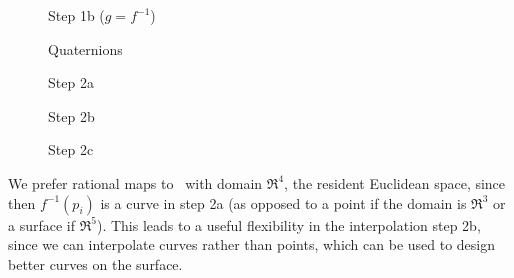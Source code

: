 \begin{figure}
\vspace{2in}
\caption{Step 1b ($g=f^{-1}$)}
\label{fig:alg1b}
\end{figure}

\begin{figure}
\vspace{2in}
\caption{Quaternions}
\label{fig:algdata}
\end{figure}

\begin{figure}
\vspace{2in}
\caption{Step 2a}
\label{fig:alg2a}
\end{figure}

\begin{figure}
\vspace{2in}
\caption{Step 2b}
\label{fig:alg2b}
\end{figure}

\begin{figure}
\vspace{2in}
\caption{Step 2c}
\label{fig:alg2c}
\end{figure}

\clearpage
\onecolumn

We prefer rational maps to \ with domain $\Re^4$, the resident
Euclidean space, since then $f^{-1}(p_i)$ is a curve in step 2a
(as opposed to a point if the domain is $\Re^3$ or a surface if $\Re^5$).
This leads to a useful flexibility in the interpolation step 2b,
since we can interpolate curves rather than points,
which can be used to design better curves on the surface.


